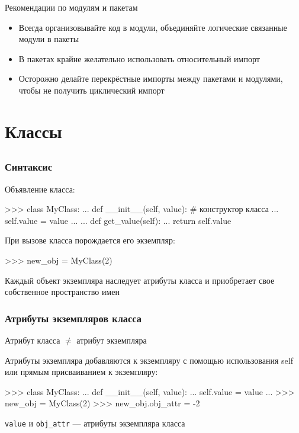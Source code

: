 \documentclass[fleqn, xcolor=x11names, 11pt]{beamer}
\begin{document}
\begin{frame}{Рекомендации по модулям и пакетам}
	\begin{itemize}
		\item Всегда организовывайте код в модули, объединяйте логические связанные модули в пакеты
		\item В пакетах крайне желательно использовать относительный импорт
		\item Осторожно делайте перекрёстные импорты между пакетами и модулями, чтобы не получить циклический импорт
	\end{itemize}
\end{frame}
\section{Классы}
\subsection*{}

\begin{frame}[fragile]\frametitle{Синтаксис}
Объявление класса:
\begin{pcode}
>>> class MyClass:
...    def __init__(self, value):    # конструктор класса
...        self.value = value
...    
...    def get_value(self):
...        return self.value 
\end{pcode}

\hfill

При вызове класса порождается его экземпляр:
\begin{pcode}
>>> new_obj = MyClass(2)
\end{pcode}

\hfill

Каждый объект экземпляра наследует атрибуты класса и  приобретает
свое собственное пространство имен

\end{frame}

\begin{frame}[fragile]\frametitle{Атрибуты экземпляров класса}

Атрибут класса $\neq$ атрибут экземпляра

\hfill

Атрибуты экземпляра добавляются к экземпляру с помощью использования self или прямым присваиванием к экземпляру:  
\begin{pcode}
>>> class MyClass:
...    def __init__(self, value):
...        self.value = value
...    
>>> new_obj = MyClass(2)
>>> new_obj.obj_attr = -2
\end{pcode}

\hfill

\texttt{value} и \texttt{obj_attr} --- атрибуты экземпляра класса

\hfill

\end{frame}
\end{document}

